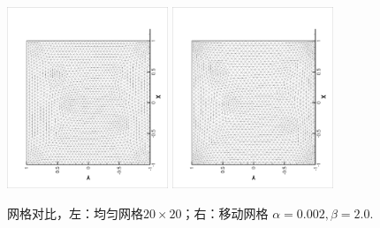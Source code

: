 \documentclass{report}
\theoremstyle{Remark}
\begin{document}
          
          \begin{figure}[ht]
            \begin{center}
              \includegraphics[width = 0.43\textwidth, angle = -90]{../picture_collidingFlow/uniform_mesh20.eps}
              \includegraphics[width = 0.43\textwidth, angle = -90]{../picture_collidingFlow/moving_mesh20.eps}
              \caption{\small 网格对比，左：均匀网格$20 \times 20$；右：移动网格 $\alpha = 0.002, \beta = 2.0$.}
              \label{fig::uniform_vs_moving_mesh}
            \end{center}
          \end{figure}
 
\end{document}
